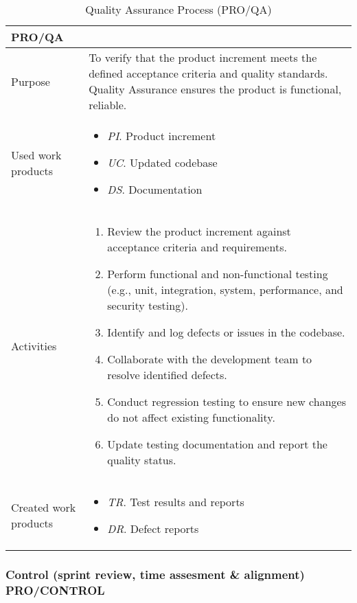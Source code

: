 \begin{table}[h!]
\begin{tabular}{l|p{}}
\hline
\textbf{PRO/QA}        & \textbf{} \\ \hline
Purpose & To verify that the product increment meets the defined acceptance criteria and quality standards. Quality Assurance ensures the product is functional, reliable. \\ \hline
Used work products    &      
\begin{itemize}
    \item \textit{PI}. Product increment
    \item \textit{UC}. Updated codebase
    \item \textit{DS}. Documentation
\end{itemize}
\\ \hline
Activities            &   
\begin{enumerate}
    \item Review the product increment against acceptance criteria and requirements.
    \item Perform functional and non-functional testing (e.g., unit, integration, system, performance, and security testing).
    \item Identify and log defects or issues in the codebase.
    \item Collaborate with the development team to resolve identified defects.
    \item Conduct regression testing to ensure new changes do not affect existing functionality.
    \item Update testing documentation and report the quality status.
\end{enumerate}
\\ \hline
Created work products &     
\begin{itemize}
    \item \textit{TR}. Test results and reports
    \item \textit{DR}. Defect reports
\end{itemize}
\end{tabular}
\caption{Quality Assurance Process (PRO/QA)}
\label{quality_assurance_process}
\end{table}

\newpage
\newpage
\subsubsection{Control (sprint review, time assesment \& alignment) PRO/CONTROL}

